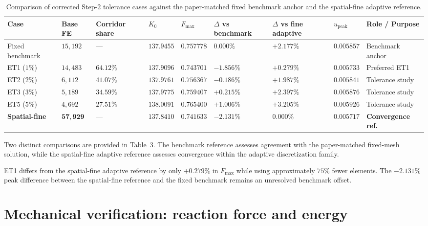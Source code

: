 \documentclass[10pt,a4paper]{article}
\begin{document}
\begin{table}[H]
\centering
\caption{Comparison of corrected Step-2 tolerance cases against the paper-matched fixed benchmark anchor and the spatial-fine adaptive reference.}
\small
\setlength{\tabcolsep}{2pt}
\renewcommand{\arraystretch}{1.2}
\begin{tabularx}{\textwidth}{L{1.8cm}C{1.1cm}C{1.2cm}C{1.6cm}C{1.5cm}C{1.5cm}C{1.5cm}C{1.6cm}Y}
\toprule
Case & Base FE & Corridor share & $K_0$ \newline [kN/mm] & $F_{\max}$ \newline [kN] & $\Delta$ vs benchmark & $\Delta$ vs fine adaptive & $u_{\mathrm{peak}}$ \newline [mm] & Role / Purpose \\
\midrule
Fixed benchmark & $15{,}192$ & --- & $137.9455$ & $0.757778$ & $0.000\%$ & $+2.177\%$ & $0.005857$ & Benchmark anchor \\
ET1 ($1\%$) & $14{,}483$ & $64.12\%$ & $137.9096$ & $0.743701$ & $-1.856\%$ & $\mathbf{+0.279\%}$ & $0.005733$ & Preferred ET1 \\
ET2 ($2\%$) & $6{,}112$ & $41.07\%$ & $137.9761$ & $0.756367$ & $-0.186\%$ & $+1.987\%$ & $0.005841$ & Tolerance study \\
ET3 ($3\%$) & $5{,}189$ & $34.59\%$ & $137.9775$ & $0.759407$ & $+0.215\%$ & $+2.397\%$ & $0.005876$ & Tolerance study \\
ET5 ($5\%$) & $4{,}692$ & $27.51\%$ & $138.0091$ & $0.765400$ & $+1.006\%$ & $+3.205\%$ & $0.005926$ & Tolerance study \\
\textbf{Spatial-fine} & $\mathbf{57{,}929}$ & --- & $\mathbf{137.8410}$ & $\mathbf{0.741633}$ & $\mathbf{-2.131\%}$ & $\mathbf{0.000\%}$ & $\mathbf{0.005717}$ & \textbf{Convergence ref.} \\
\bottomrule
\end{tabularx}
\end{table}

Two distinct comparisons are provided in Table~3. The benchmark reference assesses agreement with the paper-matched fixed-mesh solution, while the spatial-fine adaptive reference assesses convergence within the adaptive discretization family.

ET1 differs from the spatial-fine adaptive reference by only $+0.279\%$ in $F_{\max}$ while using approximately $75\%$ fewer elements. The $-2.131\%$ peak difference between the spatial-fine reference and the fixed benchmark remains an unresolved benchmark offset.

\clearpage
\section{Mechanical verification: reaction force and energy}
\end{document}
